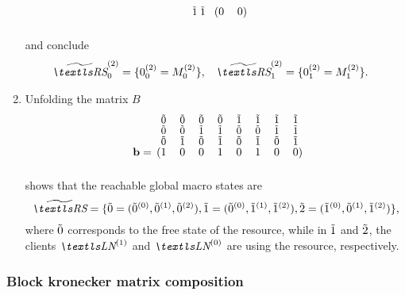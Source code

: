 \begin{runningExample}
\begin{enumerate}
\begin{equation}
\begin{blockarray}{r*{2}{@{\mkern5mu}>{$\bgroup\small$}c<{$\egroup$}}*{2}{>{$\bgroup\small$}c<{$\egroup$}}}
\begin{block}{r*{2}{@{\mkern5mu}>{$\bgroup\small$}c<{$\egroup$}}(*{2}{c})}
          & \macro{1} & \macro{1} & 0 & 0 \\
      \end{blockarray}
    \end{equation}
    and conclude
    \begin{align}
      \loc{\Macro{\RS}}{2}_0
      &= \{ \loc{0}{2}_0 = \loc{M}{2}_0\},
      &\loc{\Macro{\RS}}{2}_1
      &= \{ \loc{0}{2}_1 = \loc{M}{2}_1 \}.
    \end{align}
  \item Unfolding the matrix $B$
    \begin{equation}
      \begin{blockarray}{r@{\mkern15mu}*{8}{>{$\bgroup\small$}c<{$\egroup$}}}
        & \macro{0} & \macro{0} & \macro{0} & \macro{0} & \macro{1} &
        \macro{1} & \macro{1} & \macro{1} \\[-0.5ex]
        & \macro{0} & \macro{0} & \macro{1} & \macro{1} & \macro{0} &
        \macro{0} & \macro{1} & \macro{1} \\[-0.5ex]
        & \macro{0} & \macro{1} & \macro{0} & \macro{1} & \macro{0} &
        \macro{1} & \macro{0} & \macro{1} \\[-0.5ex]
        \begin{block}{r@{\mkern15mu}(*{8}{c})}
          \vec{b} = & 1 & 0 & 0 & 1 & 0 & 1 & 0 & 0 \\
        \end{block}
      \end{blockarray}
    \end{equation}
    shows that the reachable global macro states are
    \begin{equation}
      \Macro{\RS} = \{ \macro{0} = ( \loc{\macro{0}}{0},
      \loc{\macro{0}}{1}, \loc{\macro{0}}{2} ),
      \macro{1} = ( \loc{\macro{0}}{0},
      \loc{\macro{1}}{1}, \loc{\macro{1}}{2} ),
      \macro{2} = ( \loc{\macro{1}}{0},
      \loc{\macro{0}}{1}, \loc{\macro{1}}{2} ) \} \text,
    \end{equation}
    where $\tilde{0}$ corresponds to the free state of the resource,
    while in $\tilde{1}$ and $\tilde{2}$, the clients $\LN{1}$ and
    $\LN{0}$ are using the resource, respectively.
  \end{enumerate}
\end{runningExample}

\subsubsection{Block kronecker matrix composition}

